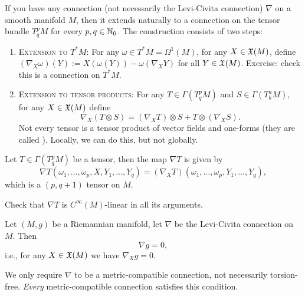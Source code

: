 \begin{remark}
If you have any connection (not necessarily the Levi-Civita
connection) $\nabla$ on a smooth manifold $M$, then it extends
naturally to a connection on the tensor bundle $T^{p}_{q}M$ for every
$p,q\in\mathbb{N}_{0}$. The construction consists of two steps:
\begin{enumerate}
\item\textsc{Extension to $T^{*}M$}: For any $\omega\in T^{*}M=\Omega^{1}(M)$,
for any $X\in\mathfrak{X}(M)$, define
$(\nabla_{X}\omega)(Y):=X(\omega(Y))-\omega(\nabla_{X}Y)$ for all $Y\in\mathfrak{X}(M)$.
Exercise: check this is a connection on $T^{*}M$.
\item\textsc{Extension to tensor products}: For any
  $T\in\Gamma(T^{p}_{q}M)$ and $S\in\Gamma(T^{a}_{b}M)$, for any $X\in\mathfrak{X}(M)$
  define
  \begin{equation}
\nabla_{X}(T\otimes S)=(\nabla_{X}T)\otimes S+T\otimes(\nabla_{X}S).
  \end{equation}
  Not every tensor is a tensor product of vector fields and one-forms
  (they are called ). Locally, we can do this,
  but not globally.
\end{enumerate}
\end{remark}

\begin{notation}
Let $T\in\Gamma(T^{p}_{q}M)$ be a tensor, then the map $\nabla T$
is given by
\begin{equation}
\nabla T(\omega_{1},\dots,\omega_{p},X,Y_{1},\dots,Y_{q})=(\nabla_{X}T)(\omega_{1},\dots,\omega_{p},Y_{1},\dots,Y_{q}),
\end{equation}
which is a $(p,q+1)$ tensor on $M$.
\end{notation}

\begin{xca}
Check that $\nabla T$ is $C^{\infty}(M)$-linear in all its arguments.
\end{xca}

\begin{theorem}
Let $(M,g)$ be a Riemannian manifold, let $\nabla$ be the Levi-Civita
connection on $M$. Then
\begin{equation}
\nabla g=0,
\end{equation}
i.e., for any $X\in\mathfrak{X}(M)$ we have $\nabla_{X}g=0$.
\end{theorem}

We only require $\nabla$ to be a metric-compatible connection, not
necessarily torsion-free. \emph{Every} metric-compatible connection
satisfies this condition.

